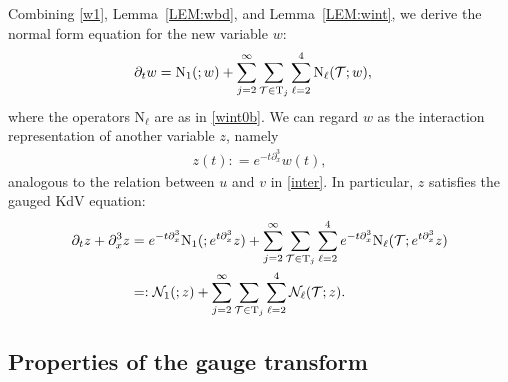 \documentclass[%
11pt,  reqno]{amsart}
\makeatletter
\newcommand{\5}{\textup{V}}
\newcommand{\noi}{\noindent}
\newcommand{\dx}{\partial_x}
\newcommand{\dt}{\partial_t}
\theoremstyle{remark}
\newcommand{\TT}{\mathcal{T}}
\newcommand{\Tr}{\mathrm{T}}
\newcommand{\gfrak}{\mathfrak{g}}
\newcommand{\pb}{\mathbf{p}}
\renewcommand{\l}{\ell}
\DeclareMathOperator{\mul}{mul}
\def\<#1>{\csname MH@symb@#1\endcsname}
\numberwithin{equation}{section}
\numberwithin{theorem}{section}
\newcommand{\NN}{\mathrm{N}}
\newcommand{\Ncal}{\mathcal{N}}
\makeatother
\begin{document}






Combining \eqref{w1}, Lemma~\ref{LEM:wbd}, and Lemma~\ref{LEM:wint}, we derive the normal form equation for the new variable $w$:
\begin{align}
\label{w2}
\dt w & =  \NN_1(\<1>;w) + \sum_{j=2}^\infty \sum_{\TT \in \Tr_j} \sum_{\l=2}^4  \NN_\l(\TT;w),
\end{align}
where the operators $\NN_\l$ are as in \eqref{wint0b}. 
We can regard $w$ as the interaction representation of another variable $z$, namely 
\begin{align}
\label{z0}
z(t) : = e^{-t\dx^3} w(t),
\end{align}
analogous to the relation between $u$ and $v$ in \eqref{inter}. In particular, $z$ satisfies the gauged KdV equation:
\begin{align}
\label{z1}
\dt z 
+ \dx^3 z
&
= 
e^{-t\dx^3}
\NN_1(\<1>;e^{t\partial_x^3}z) 
+ 
\sum_{j=2}^\infty \sum_{\TT \in \Tr_j} \sum_{\l=2}^4  
e^{-t\dx^3}
\NN_\l(\TT;e^{t\partial_x^3}z)
\\
&
=: 
\Ncal_1(\<1>;z) + \sum_{j=2}^\infty \sum_{\TT \in \Tr_j} \sum_{\l=2}^4  \Ncal_\l(\TT;z)
.
\end{align}



\subsection{Properties of the gauge transform}\label{sec:gauge_prop}
\end{document}

